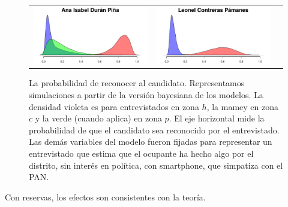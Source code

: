 \documentclass[letter,12pt]{article}
\begin{document}
\begin{figure}
\begin{tabular}{ccc}
    \includegraphics[width=.3\columnwidth]{../graphs/prReconoce4.pdf} &
    \includegraphics[width=.3\columnwidth]{../graphs/prReconoce9.pdf} \\
  \end{tabular}
  \caption{La probabilidad de reconocer al candidato. Representamos simulaciones a partir de la versión bayesiana de los modelos. La densidad violeta es para entrevistados en zona $h$, la mamey en zona $c$ y la verde (cuando aplica) en zona $p$. El eje horizontal mide la probabilidad de que el candidato sea reconocido por el entrevistado. Las demás variables del modelo fueron fijadas para representar un entrevistado que estima que el ocupante ha hecho algo por el distrito, sin interés en política, con smartphone, que simpatiza con el PAN.}\label{f:sims}
\end{figure}

Con reservas, los efectos son consistentes con la teoría. 

\end{document}
